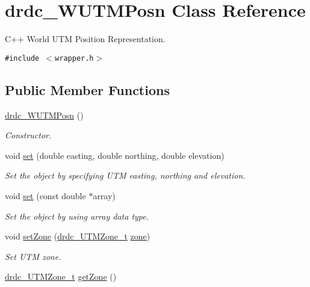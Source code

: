 \hypertarget{classdrdc__WUTMPosn}{
\section{drdc\_\-WUTMPosn Class Reference}
\label{classdrdc__WUTMPosn}
}
C++ World UTM Position Representation.  


{\tt \#include $<$wrapper.h$>$}

\subsection*{Public Member Functions}
\begin{CompactItemize}
\item 
\hyperlink{classdrdc__WUTMPosn_53156834afa26149ee93315c8fe40941}{drdc\_\-WUTMPosn} ()
\begin{CompactList}\small\item\em Constructor. \item\end{CompactList}\item 
void \hyperlink{classdrdc__WUTMPosn_b1cad0ece4e461064de5c8b0da95306f}{set} (double easting, double northing, double elevation)
\begin{CompactList}\small\item\em Set the object by specifying UTM easting, northing and elevation. \item\end{CompactList}\item 
void \hyperlink{classdrdc__WUTMPosn_96108ff7b3bbb32f5142b0c2c8ce616f}{set} (const double $\ast$array)
\begin{CompactList}\small\item\em Set the object by using array data type. \item\end{CompactList}\item 
void \hyperlink{classdrdc__WUTMPosn_ac0d6c2ca71999b6ad63740888e061a4}{setZone} (\hyperlink{structdrdc__UTMZone__t}{drdc\_\-UTMZone\_\-t} \hyperlink{classdrdc__WUTMPosn_c00550c816a3939d62df40940763beed}{zone})
\begin{CompactList}\small\item\em Set UTM zone. \item\end{CompactList}\item 
\hyperlink{structdrdc__UTMZone__t}{drdc\_\-UTMZone\_\-t} \hyperlink{classdrdc__WUTMPosn_13fa9fd7ca91fc24952f52d41339a2cb}{getZone} ()

\end{CompactItemize}
